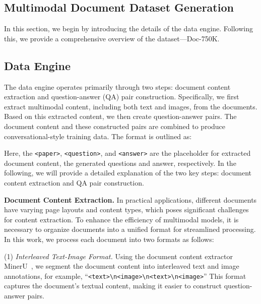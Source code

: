 \documentclass[10pt,twocolumn,letterpaper]{article}
\def\dataname{Doc-750K\xspace}
\begin{document}
\begin{CJK}{UTF8}{gbsn}
\section{Multimodal Document Dataset Generation}

In this section, we begin by introducing the details of the data engine.
Following this, we provide a comprehensive overview of the dataset---\dataname.

\newcommand\hys[1]{\textcolor{red}{#1}}
\subsection{Data Engine} 
\label{sec:data_engine}
The data engine operates primarily through two steps: document content extraction and question-answer (QA) pair construction.
Specifically, we first extract multimodal content, including both text and images, from the documents. Based on this extracted content, we then create question-answer pairs. The document content and these constructed pairs are combined to produce conversational-style training data. The format is outlined as: 


\begin{center}
\small
{}
\end{center}

\noindent Here, the \texttt{<paper>}, \texttt{<question>}, and \texttt{<answer>} are the placeholder for extracted document content, the generated questions and answer, respectively. In the following, we will provide a detailed explanation of the two key steps: document content extraction and QA pair construction.

\newcommand\ysl[1]{\textcolor{blue}{#1}}

\noindent\textbf{Document Content Extraction.}
In practical applications, different documents have varying page layouts and content types, which poses significant challenges for content extraction. To enhance the efficiency of multimodal models, it is necessary to organize documents into a unified format for streamlined processing.
In this work, we process each document into two formats as follows:

(1) \emph{Interleaved Text-Image Format.} Using the document content extractor MinerU~\cite{wang2024mineru}, we segment the document content into interleaved text and image annotations, for example, 
``\texttt{<text>\textbackslash n<image>\textbackslash n<text>\textbackslash n<image>}''
This format captures the document’s textual content, making it easier to construct question-answer pairs. 



\end{CJK}
\end{document}
